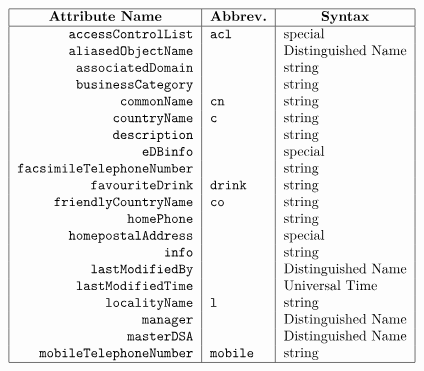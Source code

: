 
\smaller

\[\begin{tabular}{|r|l|l|}
\hline
\multicolumn{1}{|c|}{\bf Attribute Name}&
	\multicolumn{1}{c|}{\bf Abbrev.}&
			\multicolumn{1}{c|}{\bf Syntax}\\
\hline
\verb"accessControlList"&\verb"acl"&special\\
\verb"aliasedObjectName"&&Distinguished Name\\
\verb"associatedDomain"&&string\\
\verb"businessCategory"&&string\\
\verb"commonName"&\verb"cn"&string\\
\verb"countryName"&\verb"c"&string\\
\verb"description"&&string\\
\verb"eDBinfo"&&special\\
\verb"facsimileTelephoneNumber"&&string\\
\verb"favouriteDrink"&\verb"drink"&string\\
\verb"friendlyCountryName"&\verb"co"&string\\
\verb"homePhone"&&string\\
\verb"homepostalAddress"&&special\\
\verb"info"&&string\\
\verb"lastModifiedBy"&&Distinguished Name\\
\verb"lastModifiedTime"&& Universal Time\\
\verb"localityName"&\verb"l"&string\\
\verb"manager"&&Distinguished Name\\
\verb"masterDSA"&&Distinguished Name\\
\verb"mobileTelephoneNumber"&\verb"mobile"&string\\
\hline
\end{tabular}\]
